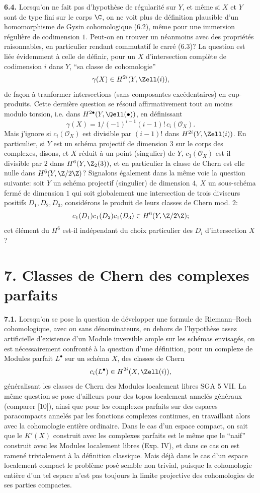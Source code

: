 \textbf{6.4.} Lorsqu'on ne fait pas d'hypothèse de régularité sur $Y$, et même si $X$ et $Y$ sont de type fini sur le corps $\C$, on ne voit plus de définition plausible d'un homomorphisme de Gysin cohomologique (6.2), même pour une immersion régulière de codimension $1$. Peut-on en trouver un néanmoins avec des propriétés raisonnables, en particulier rendant commutatif le carré (6.3)? La question est liée évidemment à celle de définir, pour un $X$ d'intersection complète de codimension $i$ dans $Y$, ``sa classe de cohomologie''
\[
 \gamma(X)\in H^{2i}(Y,\Zell(i)),
\]
de façon à tranformer intersections (sans composantes excédentaires) en cup-produits. Cette dernière question se résoud affirmativement tout au moins modulo torsion, i.e. dans $H^{2\bullet}(Y,\Qell(\bullet))$, en définissant
\[
 \gamma(X)=1/(-1)^{i-1}(i-1)!\,c_i(\mathcal O_X).
\]
Mais j'ignore si $c_i(\mathcal O_X)$ est divisible par $(i-1)!$ dans $H^{2i}(Y,\Zell(i))$. En particulier, si $Y$ est un schéma projectif de dimension $3$ sur le corps des complexes, disons, et $X$ réduit à un point (singulier) de $Y$, $c_3(\mathcal O_X)$ est-il divisible par $2$ dans $H^6(Y,\Z_2(3))$, et en particulier la classe de Chern est elle nulle dans $H^6(Y,\Z/2\Z)$? Signalons également dans la même voie la question suivante: soit $Y$ un schéma projectif (singulier) de dimension $4$, $X$ un sous-schéma fermé de dimension $1$ qui soit globalement une intersection de trois diviseurs positifs $D_1,D_2,D_3$, considérons le produit de leurs classes de Chern mod. $2$:
\[
 c_1(D_1)c_1(D_2)c_1(D_3)\in H^6(Y,\Z/2\Z);
\]
cet
élément du $H^6$ est-il indépendant du choix particulier des $D_i$ d'intersection $X$?

\section*{7. Classes de Chern des complexes parfaits}

\textbf{7.1.} Lorsqu'on se pose la question de développer une formule de Riemann--Roch cohomologique, avec ou sans dénominateurs, en dehors de l'hypothèse assez artificielle d'existence d'un Module inversible ample sur les schémas envisagés, on est nécessairement confronté à la question d'une définition, pour un complexe de Modules parfait $L^\bullet$ sur un schéma $X$, des classes de Chern
\[
 c_i(L^\bullet)\in H^{2i}(X,\Zell(i)),
\]
généralisant les classes de Chern des Modules localement libres SGA 5 VII. La même question se pose d'ailleurs pour des topos localement annelés généraux (comparer [10]), ainsi que pour les complexes parfaits sur des espaces paracompacts annelés par les fonctions complexes continues, en travaillant alors avec la cohomologie entière ordinaire. Dans le cas d'un espace compact, on sait que le $K'(X)$ construit avec les complexes parfaits est le même que le ``naif'' construit avec les Modules localement libres (Exp. IV), et dans ce cas on est ramené trivialement à la définition classique. Mais déjà dans le cas d'un espace localement compact le problème posé semble non trivial, puisque la cohomologie entière d'un tel espace n'est pas toujours la limite projective des cohomologies de ses parties compactes.

